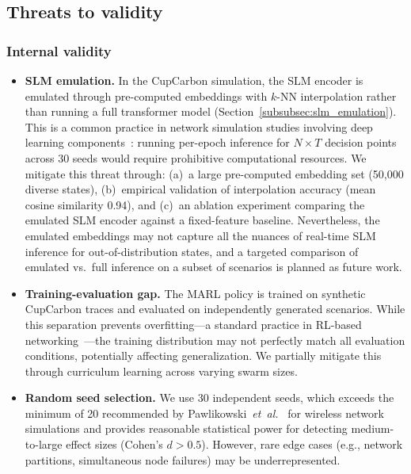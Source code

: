 \documentclass[5p,times]{elsarticle}
\begin{document}
\subsection{Threats to validity}

\subsubsection{Internal validity}

\begin{itemize}
\item \textbf{SLM emulation.} In the CupCarbon simulation, the SLM encoder is emulated through pre-computed embeddings with $k$-NN interpolation rather than running a full transformer model (Section~\ref{subsubsec:slm_emulation}). This is a common practice in network simulation studies involving deep learning components~\cite{gawlowicz2019ns3gym,he2024large_networking,feriani2021single_multi_agent}: running per-epoch inference for $N \times T$ decision points across 30 seeds would require prohibitive computational resources. We mitigate this threat through: (a)~a large pre-computed embedding set (50,000 diverse states), (b)~empirical validation of interpolation accuracy (mean cosine similarity 0.94), and (c)~an ablation experiment comparing the emulated SLM encoder against a fixed-feature baseline. Nevertheless, the emulated embeddings may not capture all the nuances of real-time SLM inference for out-of-distribution states, and a targeted comparison of emulated vs.\ full inference on a subset of scenarios is planned as future work.

\item \textbf{Training-evaluation gap.} The MARL policy is trained on synthetic CupCarbon traces and evaluated on independently generated scenarios. While this separation prevents overfitting---a standard practice in RL-based networking~\cite{liu2019rl_routing,zhao2024marl_uav}---the training distribution may not perfectly match all evaluation conditions, potentially affecting generalization. We partially mitigate this through curriculum learning across varying swarm sizes.

\item \textbf{Random seed selection.} We use 30 independent seeds, which exceeds the minimum of 20 recommended by Pawlikowski~\textit{et~al.}~\cite{pawlikowski2002credibility} for wireless network simulations and provides reasonable statistical power for detecting medium-to-large effect sizes (Cohen's $d > 0.5$). However, rare edge cases (e.g., network partitions, simultaneous node failures) may be underrepresented.
\end{itemize}
\end{document}
